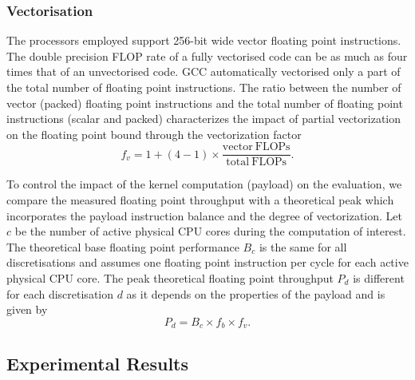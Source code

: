 \documentclass[11pt, a4paper]{scrartcl}
\begin{document}
\subsubsection{Vectorisation}
\label{sssec:vectorisation}

The processors employed support 256-bit wide vector floating point
instructions. The double precision FLOP rate of a fully vectorised
code can be as much as four times that of an unvectorised code. GCC
automatically vectorised only a part of the total number of floating
point instructions. The ratio between the number of vector (packed)
floating point instructions and the total number of floating point
instructions (scalar and packed) characterizes the impact of partial
vectorization on the floating point bound through the vectorization
factor
\begin{equation}
f_{v} = 1 + (4 - 1) \times \frac{\mathrm{vector\ FLOPs}} {\mathrm{total\ FLOPs}}.
\end{equation}

To control the impact of the kernel computation (payload) on the
evaluation, we compare the measured floating point throughput with a
theoretical peak which incorporates the payload instruction balance
and the degree of vectorization. Let $c$ be the number of active
physical CPU cores during the computation of interest. The theoretical
base floating point performance $B_{c}$ is the same for all
discretisations and assumes one floating point instruction per cycle
for each active physical CPU core. The peak theoretical floating point
throughput $P_{d}$ is different for each discretisation $d$ as it
depends on the properties of the payload and is given by
\begin{equation}
P_{d} = B_{c} \times f_{b} \times f_{v}.
\end{equation}

\subsection{Experimental Results}
\label{ssec:experimental-results}
\end{document}
